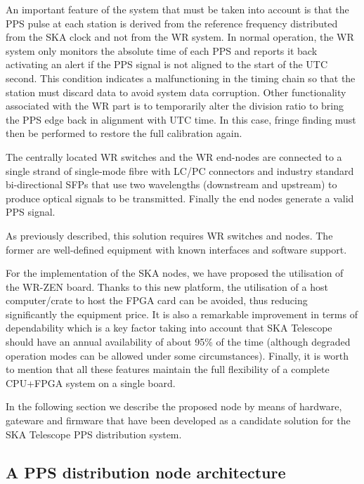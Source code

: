 An important feature of the system that must be taken into account is that the PPS pulse
at each station is derived from the reference frequency distributed from
the SKA clock and not from the WR system. In normal operation, the WR system
only monitors the absolute time of each PPS and reports it back activating an
alert if the PPS signal is not aligned to the start of the UTC second. This
condition indicates a malfunctioning in the timing chain so that the station must
discard data to avoid system data corruption. Other functionality associated
with the WR part is to temporarily alter the division ratio to bring the PPS
edge back in alignment with UTC time. In this case, fringe finding must then be
performed to restore the full calibration again.

The centrally located WR switches and the WR end-nodes are connected to a
single strand of single-mode fibre with LC/PC connectors and industry standard
bi-directional SFPs that use two wavelengths (downstream and upstream) to
produce optical signals to be transmitted. Finally the end nodes generate a valid PPS
signal. 

As previously described, this solution requires WR switches and nodes. The
former are well-defined equipment with known interfaces and software support. 

For the implementation of the SKA nodes, we have proposed the utilisation of
the WR-ZEN board. Thanks to this new platform, the utilisation of a host
computer/crate to host the FPGA card can be avoided, thus reducing significantly
the equipment price. It is also a remarkable improvement in terms of
dependability which is a key factor taking into account that SKA Telescope
should have an annual availability of about 95\% of the time (although degraded
operation modes can be allowed under some circumstances).  Finally, it is worth to mention that
all these features maintain the full flexibility of a complete
CPU+FPGA system on a single board. 

In the following section we describe the proposed node by means of hardware, gateware and
firmware that have been developed as a candidate solution for the SKA Telescope
PPS distribution system. 

\subsection{A PPS distribution node architecture}
\label{subsec:ska-pps-system-arch}


